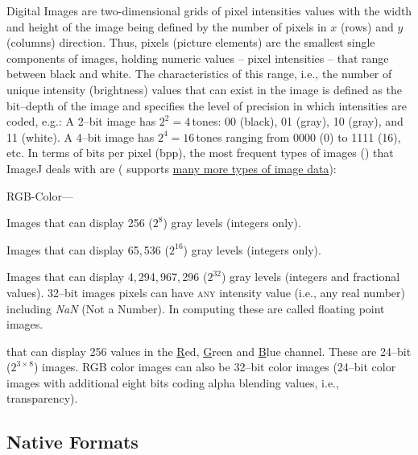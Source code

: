 Digital Images are two-dimensional grids of pixel
intensities values with the width and height of the image being defined
by the number of pixels in $x$ (rows) and $y$ (columns) direction.
Thus, pixels (picture elements) are the smallest single components
of images, holding numeric values -- pixel intensities -- that range
between black and white. The characteristics of this range, i.e.,
the number of unique intensity (brightness) values that can exist
in the image is defined as the bit--depth
of the image and specifies the level of precision in which intensities
are coded, e.g.: A 2--bit image has $2^{2}=4$\,tones: 00 (black),
01 (gray), 10 (gray), and 11 (white). A 4--bit image has $2^{4}=16$\,tones
ranging from 0000 (0) to 1111 (16), etc. In terms of bits per pixel
(bpp), the most frequent types
of images () that
ImageJ deals with are (
supports \href{http://imagejdev.org/imagej2-pixel-types}{many more types of image data}):
\begin{lyxlist}{RGB-Color---}
\item [{\textbf{8--bit}}] \noindent Images that can display 256 ($2^{8}$)
gray levels (integers only).
\item [{\textbf{16--bit}}] \noindent Images that can display 65,\,536
($2^{16}$) gray levels (integers only).
\item [{\textbf{32--bit}}] \noindent Images that can display 4,\,294,\,967,\,296
($2^{32}$) gray levels (integers and fractional values). 32--bit
images pixels can have\textsc{ any} intensity value (i.e., any real
number) including \emph{NaN} (Not
a Number). In computing these are called floating point images.
\item [{\textbf{RGB\ Color}}] \noindent {} that
can display 256 values in the \uline{R}ed, \uline{G}reen and
\uline{B}lue channel. These are 24--bit ($2^{3\times8}$) images.
RGB color images can also be 32--bit
color images (24--bit color images with additional eight bits coding
alpha blending values, i.e., transparency).
\end{lyxlist}

\subsection*{Native Formats\label{sub:Native-Formats}}

